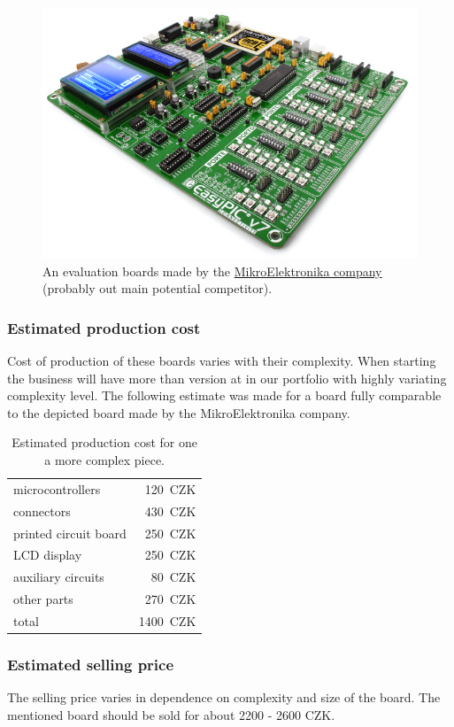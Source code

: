 \documentclass[a4paper,twoside,15pt]{book}
\begin{document}
			\begin{figure}[h!]
				\centering{}
				\includegraphics[width=.5\textwidth]{images/snapshot0.png}
				\caption{An evaluation boards made by the \href{http://www.mikroe.com/}{MikroElektronika company} (probably out main potential competitor).}
			\end{figure}

			\subsubsection{Estimated production cost}
				Cost of production of these boards varies with their complexity. When starting the business will have more than version at in our portfolio with highly variating complexity level. The following estimate was made for a board fully comparable to the depicted board made by the MikroElektronika company.
				\begin{table}[h!]
					\begin{tabular}{lr}
						microcontrollers		& 120~CZK	\\
						connectors				& 430~CZK	\\
						printed circuit board	& 250~CZK	\\
						LCD display				& 250~CZK	\\
						auxiliary circuits		& 80~CZK	\\
						other parts				& 270~CZK	\\\hline
						total					& 1400~CZK
					\end{tabular}
				\caption{Estimated production cost for one a more complex piece.}
				\end{table}

			\subsubsection{Estimated selling price}
				The selling price varies in dependence on complexity and size of the board. The mentioned board should be sold for about 2200 - 2600 CZK.
\end{document}
